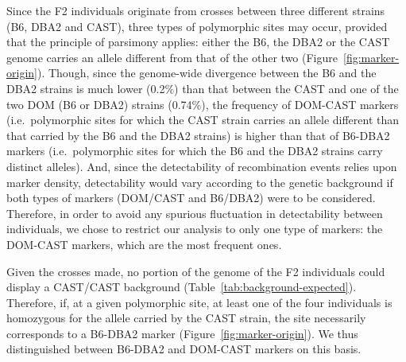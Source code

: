 \begin{mccorrection}

Since the F2 individuals originate from crosses between three different strains (B6, DBA2 and CAST), three types of polymorphic sites may occur, provided that the principle of parsimony applies: either the B6, the DBA2 or the CAST genome carries an allele different from that of the other two (Figure~\ref{fig:marker-origin}).
Though, since the genome-wide divergence between the B6 and the DBA2 strains is much lower (0.2\%) than that between the CAST and one of the two DOM (B6 or DBA2) strains (0.74\%), the frequency of DOM-CAST markers (i.e.\ polymorphic sites for which the CAST strain carries an allele different than that carried by the B6 and the DBA2 strains) is higher than that of B6-DBA2 markers (i.e.\ polymorphic sites for which the B6 and the DBA2 strains carry distinct alleles).
And, since the detectability of recombination events relies upon marker density, detectability would vary according to the genetic background if both types of markers (DOM/CAST and B6/DBA2) were to be considered.
Therefore, in order to avoid any spurious fluctuation in detectability between individuals, we chose to restrict our analysis to only one type of markers: the DOM-CAST markers, which are the most frequent ones.

Given the crosses made, no portion of the genome of the F2 individuals could display a CAST/CAST background (Table~\ref{tab:background-expected}).
Therefore, if, at a given polymorphic site, at least one of the four individuals is homozygous for the allele carried by the CAST strain, the site necessarily corresponds to a B6-DBA2 marker (Figure~\ref{fig:marker-origin}).
We thus distinguished between B6-DBA2 and DOM-CAST markers on this basis.

\end{mccorrection}



